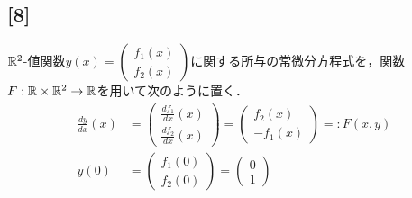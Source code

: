\documentclass[uplatex,dvipdfmx]{jsarticle}
\begin{document}
\subsection*{[8]}
$\mathbb{R}^2$-値関数$y(x)=\begin{pmatrix}f_1(x)\\f_2(x)\end{pmatrix}$に関する所与の常微分方程式を，関数$F:\mathbb{R}\times\mathbb{R}^2\to\mathbb{R}$を用いて次のように置く．
\begin{align*}
    \frac{dy}{dx}(x) &= \begin{pmatrix}\frac{df_1}{dx}(x)\\\frac{df_2}{dx}(x)\end{pmatrix}=\begin{pmatrix}f_2(x)\\-f_1(x)\end{pmatrix}=:F(x,y)\\
    y(0)&=\begin{pmatrix}f_1(0)\\f_2(0)\end{pmatrix}=\begin{pmatrix}0\\1\end{pmatrix}
\end{align*}
\end{document}
